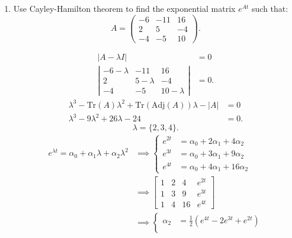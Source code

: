 \documentclass{zc-ust-hw}
\begin{document}
\begin{enumerate}
    \newpage

  \item Use Cayley-Hamilton theorem to find the exponential matrix \( e^{At}
    \) such that: 
    \[
      A=\begin{pmatrix} -6&-11&16\\2&5&-4\\-4&-5&10 \end{pmatrix} 
    .\] 

    \begin{sol}
      \begin{align}
        |A - \lambda I| &= 0 \\
        \left|\begin{array}{ccc} -6-\lambda & -11 & 16 \\ 2 & 5-\lambda & -4 \\ -4 & -5 & 10-\lambda \end{array}\right| &= 0
      .\end{align}
      \begin{align*}
        \lambda^3 - \text{Tr}(A)\lambda^2 + \text{Tr}(\text{Adj}(A))\lambda - |A| &= 0 \\
        \lambda^3 - 9\lambda^2 + 26\lambda - 24 &= 0
      .\end{align*}
      \begin{equation}
        \lambda = \{2, 3, 4\}
      .\end{equation}
      \begin{align}
        e^{\lambda t} = \alpha_{0} + \alpha_{1} \lambda + \alpha_{2} \lambda ^2 
        & \implies
        \begin{cases}
          e^{2t} &= \alpha_{0} + 2\alpha_{1} + 4\alpha_{2} \\
          e^{3t} &= \alpha_{0} + 3\alpha_{1} + 9\alpha_{2} \\
          e^{4t} &= \alpha_{0} + 4\alpha_{1} + 16\alpha_{2}
        \end{cases} \\
        &\implies
        \left[
          \begin{array}{ccc|c}
            1 & 2 & 4 & e^{2t} \\
            1 & 3 & 9 & e^{3t} \\
            1 & 4 & 16 & e^{4t}
          \end{array} 
        \right] \\
        &\implies 
        \begin{cases}
          \alpha_{2} &= \frac{1}{2}(e^{4t}-2e^{3t}+e^{2t}) \\

\end{cases}
\end{align}
\end{sol}
\end{enumerate}
\end{document}
